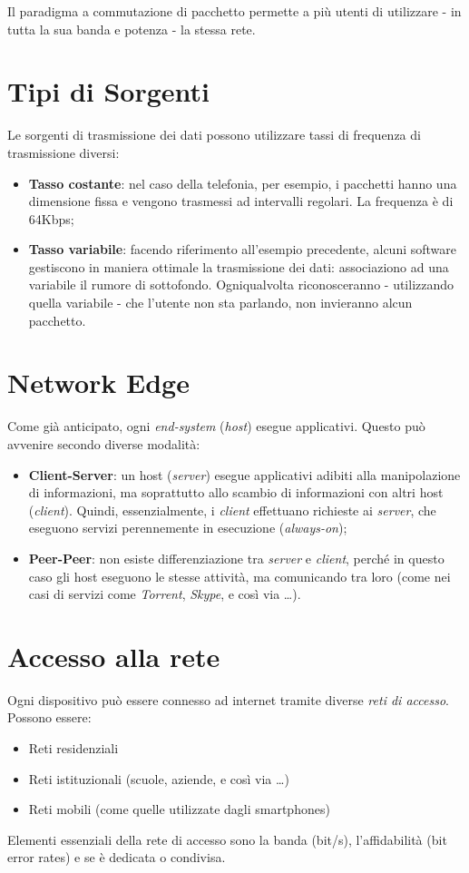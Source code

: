 Il paradigma a commutazione di pacchetto permette a più utenti di utilizzare - in tutta la sua banda e potenza - la stessa rete.

\section{Tipi di Sorgenti}
Le sorgenti di trasmissione dei dati possono utilizzare tassi di frequenza di trasmissione diversi:
\begin{itemize}
    \item \textbf{Tasso costante}: nel caso della telefonia, per esempio, i pacchetti hanno una dimensione fissa e vengono trasmessi ad intervalli regolari. La frequenza è di 64Kbps;
    \item \textbf{Tasso variabile}: facendo riferimento all'esempio precedente, alcuni software gestiscono in maniera ottimale la trasmissione dei dati: associaziono ad una variabile il rumore di sottofondo. Ogniqualvolta riconosceranno - utilizzando quella variabile - che l'utente non sta parlando, non invieranno alcun pacchetto.
\end{itemize}

\section{Network Edge}
Come già anticipato, ogni \textit{end-system} (\textit{host}) esegue applicativi. Questo può avvenire secondo diverse modalità:
\begin{itemize}
	\item \textbf{Client-Server}: un host (\textit{server}) esegue applicativi adibiti alla manipolazione di informazioni, ma soprattutto allo scambio di informazioni con altri host (\textit{client}). Quindi, essenzialmente, i \textit{client} effettuano richieste ai \textit{server}, che eseguono servizi perennemente in esecuzione (\textit{always-on});
	\item \textbf{Peer-Peer}: non esiste differenziazione tra \textit{server} e \textit{client}, perché in questo caso gli host eseguono le stesse attività, ma comunicando tra loro (come nei casi di servizi come \textit{Torrent}, \textit{Skype}, e così via \ldots).
\end{itemize}

\section{Accesso alla rete}
Ogni dispositivo può essere connesso ad internet tramite diverse \textit{reti di accesso}. Possono essere:
\begin{itemize}
	\item Reti residenziali
	\item Reti istituzionali (scuole, aziende, e così via \ldots)
	\item Reti mobili (come quelle utilizzate dagli smartphones)
\end{itemize}
Elementi essenziali della rete di accesso sono la banda (bit/s), l'affidabilità (bit error rates) e se è dedicata o condivisa.
